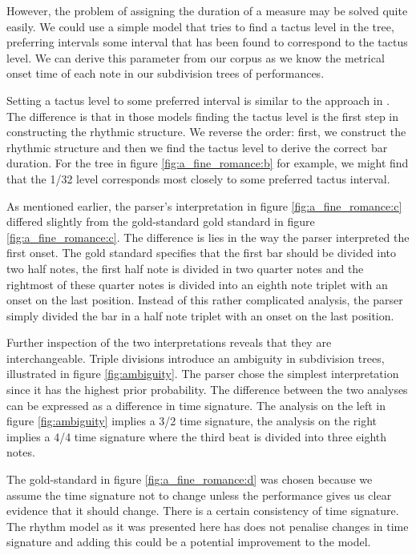 However, the problem of assigning the duration of a measure may be solved quite easily. We could use a simple model that tries to find a tactus level in the tree, preferring intervals some interval that has been found to correspond to the tactus level. We can derive this parameter from our corpus as we know the metrical onset time of each note in our subdivision trees of performances. 

Setting a tactus level to some preferred interval is similar to the approach in  \citet{temperley2009unified, temperley2007music}. The difference is that in those models finding the tactus level is the first step in constructing the rhythmic structure. We reverse the order: first, we construct the rhythmic structure and then we find the tactus level to derive the correct bar duration. For the tree in figure \ref{fig:a_fine_romance:b} for example, we might find that the 1/32 level corresponds most closely to some preferred tactus interval.

As mentioned earlier, the parser's interpretation in figure \ref{fig:a_fine_romance:c} differed slightly from the gold-standard gold standard in figure \ref{fig:a_fine_romance:c}. The difference is lies in the way the parser interpreted the first onset. The gold standard specifies that the first bar should be divided into two half notes, the first half note is divided in two quarter notes and the rightmost of these quarter notes is divided into an eighth note triplet with an onset on the last position. Instead of this rather complicated analysis, the parser simply divided the bar in a half note triplet with an onset on the last position. 

Further inspection of the two interpretations reveals that they are interchangeable. Triple divisions introduce an ambiguity in subdivision trees, illustrated in figure \ref{fig:ambiguity}. The parser chose the simplest interpretation since it has the highest prior probability. The difference between the two analyses can be expressed as a difference in time signature. The analysis on the left in figure \ref{fig:ambiguity} implies a 3/2 time signature, the analysis on the right implies a 4/4 time signature where the third beat is divided into three eighth notes.

The gold-standard in figure \ref{fig:a_fine_romance:d} was chosen because we assume the time signature not to change unless the performance gives us clear evidence that it should change. There is a certain consistency of time signature. The rhythm model as it was presented here has does not penalise changes in time signature and adding this could be a potential improvement to the model.


